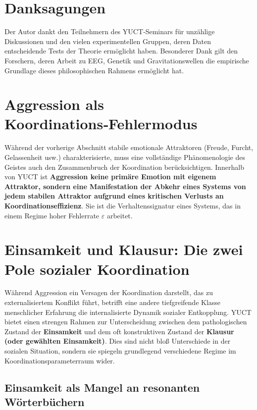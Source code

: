 \documentclass[12pt,a4paper]{article}
\begin{document}
	\section*{Danksagungen}
	
	Der Autor dankt den Teilnehmern des YUCT‑Seminars für unzählige Diskussionen und den vielen experimentellen Gruppen, deren Daten entscheidende Tests der Theorie ermöglicht haben. Besonderer Dank gilt den Forschern, deren Arbeit zu EEG, Genetik und Gravitationswellen die empirische Grundlage dieses philosophischen Rahmens ermöglicht hat.
	
	\section{Aggression als Koordinations‑Fehlermodus}
	
	Während der vorherige Abschnitt stabile emotionale Attraktoren (Freude, Furcht, Gelassenheit usw.) charakterisierte, muss eine vollständige Phänomenologie des Geistes auch den Zusammenbruch der Koordination berücksichtigen. Innerhalb von YUCT ist \textbf{Aggression keine primäre Emotion mit eigenem Attraktor, sondern eine Manifestation der Abkehr eines Systems von jedem stabilen Attraktor aufgrund eines kritischen Verlusts an Koordinationseffizienz}. Sie ist die Verhaltenssignatur eines Systems, das in einem Regime hoher Fehlerrate \(\varepsilon\) arbeitet.
	
	\section{Einsamkeit und Klausur: Die zwei Pole sozialer Koordination}
	
	Während Aggression ein Versagen der Koordination darstellt, das zu externalisiertem Konflikt führt, betrifft eine andere tiefgreifende Klasse menschlicher Erfahrung die internalisierte Dynamik sozialer Entkopplung. YUCT bietet einen strengen Rahmen zur Unterscheidung zwischen dem pathologischen Zustand der \textbf{Einsamkeit} und dem oft konstruktiven Zustand der \textbf{Klausur (oder gewählten Einsamkeit)}. Dies sind nicht bloß Unterschiede in der sozialen Situation, sondern sie spiegeln grundlegend verschiedene Regime im Koordinationsparameterraum wider.
	
	\subsection{Einsamkeit als Mangel an resonanten Wörterbüchern}
	
\end{document}
